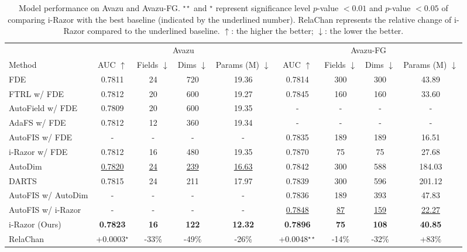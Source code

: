\documentclass[10pt,journal,compsoc]{IEEEtran}
\begin{document}
\begin{table*}[thp!]
\caption{Model performance on Avazu and Avazu-FG. $^{\star\star}$ and $^{\star}$ represent significance level $p$-value $< 0.01$ and $p$-value $<0.05$ of comparing i-Razor with the best baseline (indicated by the underlined number). RelaChan represents the relative change of i-Razor compared to the underlined baseline. $\uparrow$: the higher the better; $\downarrow$: the lower the better.}
\centering
\begin{tabular}{lcccccccc}
\toprule[1pt]
 & \multicolumn{4}{c}{Avazu} & \multicolumn{4}{c}{Avazu-FG} \\ \cmidrule(r){2-5} \cmidrule(r){6-9}
Method & AUC $\uparrow$ & Fields $\downarrow$ & Dims $\downarrow$ & Params (M) $\downarrow$ & AUC $\uparrow$ & Fields $\downarrow$ & Dims $\downarrow$ & Params (M) $\downarrow$ \\ \hline
FDE & 0.7811 & 24 & 720 & 19.36 & 0.7814 & 300 & 300 & 43.89 \\
FTRL w/ FDE & 0.7812 & 20 & 600 & 19.27 & 0.7845 & 160 & 160 & 33.60 \\
  {AutoField w/ FDE} & 0.7809 & 20 & 600 & 19.35 & - & - & - & - \\
  {AdaFS w/ FDE} & 0.7812 & 12 & 360 & 19.34 & - & - & - & - \\
AutoFIS w/ FDE & - & - & - & - & 0.7835 & 189 & 189 & 16.51 \\
i-Razor w/ FDE & 0.7812 & 16 & 480 & 19.35 & 0.7870 & 75 & 75 & 27.68 \\ \midrule
AutoDim & {\ul{0.7820}} & {\ul{24}} & {\ul{239}} & {\ul{16.63}} & 0.7842 & 300 & 588 & 184.03 \\
DARTS & 0.7815 & 24 & 211 & 17.97 & 0.7839 & 300 & 596 & 201.12 \\ \midrule
AutoFIS w/ AutoDim & - & - & - & - & 0.7836 & 189 & 393 & 47.83 \\
AutoFIS w/ i-Razor & - & - & - & - & {\ul{0.7848}} & {\ul{87}} & {\ul{159}} & {\ul{22.27}} \\
i-Razor (Ours) & \textbf{0.7823} & \textbf{16} & \textbf{122} & \textbf{12.32} & \textbf{0.7896} & \textbf{75} & \textbf{108} & \textbf{40.85} \\ \midrule
RelaChan & +0.0003$^{\star}$ & -33\% & -49\% & -26\% & +0.0048$^{\star\star}$ & -14\% & -32\% & +83\% \\ \bottomrule[1pt]
\end{tabular}
\label{result:avazu}
\end{table*}
\end{document}
